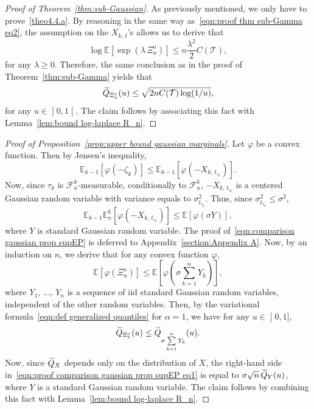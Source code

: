 \documentclass[10pt]{amsart}
\theoremstyle{definition}\newtheorem{defi}[theo]{Definition}\newtheorem{rema}[theo]{Remark}\newtheorem{exam}[theo]{Example}\newtheorem{exem}[theo]{Example}\newtheorem{nota}[theo]{Notation}
\newcommand{\bE}{\mathbb{E}}
\newcommand{\cF}{\mathcal{F}}
\newcommand{\cT}{\mathcal{T}}
\newcommand{\intervalleoo}[2]{\mathopen{]} #1\mathclose{}\mathpunct{},#2\mathclose{[}}
\newcommand{\intervalleof}[2]{\mathopen{]} #1\mathclose{}\mathpunct{},#2\mathclose{]}}
\let\oldtilde\tilde
\renewcommand*{\tilde}[1]{\mathchoice{\widetilde{#1}}{\widetilde{#1}}{\oldtilde{#1}}{\oldtilde{#1}}}
\begin{document}
\begin{proof}[Proof of Theorem~\ref{thm:sub-Gaussian}]
As previously mentioned, we only have to prove~\eqref{theo4.4.a}. By reasoning in the same way as~\eqref{eqn:proof thm sub-Gamma eq2}, the assumption on the $X_{k,\,t}$'s allows us to derive that
\begin{equation}
\log\bE[\exp(\lambda\,\Xi_n^o)]\leq n\frac{\lambda^2}{2}C(\cT),
\end{equation}
for any $\lambda\geq 0$. Therefore, the same conclusion as in the proof of Theorem~\ref{thm:sub-Gamma} yields that
\begin{equation}
\tilde Q_{\Xi_n^o}(u)\leq \sqrt{2nC(\cT)\log(1/u)},
\end{equation}
for any $u\in\intervalleoo 01$. The claim follows by associating this fact with Lemma~\ref{lem:bound log-laplace R_n}.
\end{proof}

\begin{proof}[Proof of Proposition~\ref{prop:upper bound gaussian marginals}]
Let $\varphi$ be a convex function. Then by Jensen's inequality,
\[
\bE_{k-1}\left[\varphi(-\zeta_k)\right]\leq \bE_{k-1}\left[\varphi\left(-X_{k,\,t_{\tau_k}}\right)\right].
\]
Now, since $\tau_k$ is $\cF_n^k$-measurable, conditionally to $\cF_n^k$, $-X_{k,\,t_{\tau_k}}$ is a centered Gaussian random variable with variance equals to $\sigma^2_{t_{\tau_k}}$. Thus, since $\sigma^2_{t_{\tau_k}}\leq \sigma^2$,
\begin{equation}\label{eqn:comparison gaussian prop supEP}
\bE_{k-1}\bE_n^k\left[\varphi\left(-X_{k,\,t_{\tau_k}}\right)\right]\leq \bE[\varphi(\sigma Y)],
\end{equation}
where $Y$ is standard Gaussian random variable. The proof of~\eqref{eqn:comparison gaussian prop supEP} is deferred to Appendix~\ref{section:Appendix A}. Now, by an induction on $n$, we derive that for any convex function $\varphi$,
\begin{equation}
\bE\left[\varphi\left(\Xi_n^o\right)\right]\leq \bE\left[\varphi\left(\sigma\sum_{k=1}^n Y_k\right)\right],
\end{equation}
where $Y_1,\,\ldots,\,Y_n$ is a sequence of iid standard Gaussian random variables, independent of the other random variables. Then, by the variational formula~\eqref{eqn:def generalized quantiles} for $\alpha=1$, we have for any $u\in\intervalleof 01$,
\begin{equation}\label{eqn:proof comparison gaussian prop supEP eq1}
\tilde Q_{\Xi_n^o}(u)\leq \tilde Q_{\sigma\mathop{\sum_{k=1}\limits^n} Y_k}(u).
\end{equation}
Now, since $\tilde Q_X$ depends only on the distribution of $X$, the right-hand side in~\eqref{eqn:proof comparison gaussian prop supEP eq1} is equal to $\sigma\sqrt n\,\tilde Q_Y(u)$, where $Y$ is a standard Gaussian random variable. The claim follows by combining this fact with Lemma~\ref{lem:bound log-laplace R_n}.
\end{proof}
\end{document}
